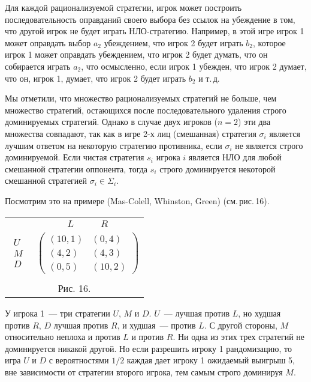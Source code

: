 Для каждой рационализуемой стратегии, игрок может построить
последовательность оправданий своего выбора без ссылок на убеждение
в том, что другой игрок не будет играть НЛО-стратегию. Например, в
этой игре игрок 1 может оправдать выбор $a_2$ убеждением, что  игрок
2 будет играть $b_2$, которое игрок 1 может оправдать убеждением,
что игрок 2 будет думать, что он собирается играть $a_2$, что
осмысленно, если игрок 1 убежден, что игрок 2 думает, что он, игрок
1, думает, что игрок 2 будет играть $b_2$  и т.\,д.

Мы отметили, что множество рационализуемых стратегий не больше, чем
множество стратегий, остающихся после последовательного удаления
строго доминируемых стратегий. Однако в случае двух игроков ($n=2$)
эти два множества совпадают, так как  в игре 2-х лиц (смешанная)
стратегия $\sigma_i$ является лучшим ответом на некоторую стратегию
противника, если $\sigma_i$ не является  строго доминируемой. Если
чистая стратегия $s_i$  игрока $i$  является НЛО для любой смешанной
стратегии оппонента, тогда $s_i$ строго доминируется некоторой
смешанной стратегией $\sigma_i\in\Sigma_i$.

Посмотрим это на примере (Mas-Colell, Whinston, Green)
(см.\,рис.\,16).

\begin{center}
\begin{tabular}{cc}
&$\begin{array}{cc} L\quad &\quad R \end{array}$\\
$\begin{array}{c} U\\ M\\ D\end{array}$& $\left(\begin{array}{cc}
(10,1)&(0,4)\\
(4,2)&(4,3)\\
(0,5)&(10,2) \end{array}\right)$\\
\multicolumn{2}{c}{}\\
\multicolumn{2}{c}{Рис. 16.}\\
\end{tabular}
\end{center}

У игрока 1~--- три стратегии $U$, $M$ и $D$. $U$~--- лучшая против
$L$, но худшая против $R$, $D$ лучшая против $R$, и худшая~---
против $L$. С другой стороны, $M$ относительно неплоха и против $L$
и против $R$. Ни одна из этих трех стратегий не доминируется никакой
другой. Но если разрешить игроку 1 рандомизацию, то игра $U$ и $D$ с
вероятностями $1/2$ каждая дает игроку 1 ожидаемый выигрыш 5, вне
зависимости от стратегии второго игрока, тем самым строго доминируя
$M$.

